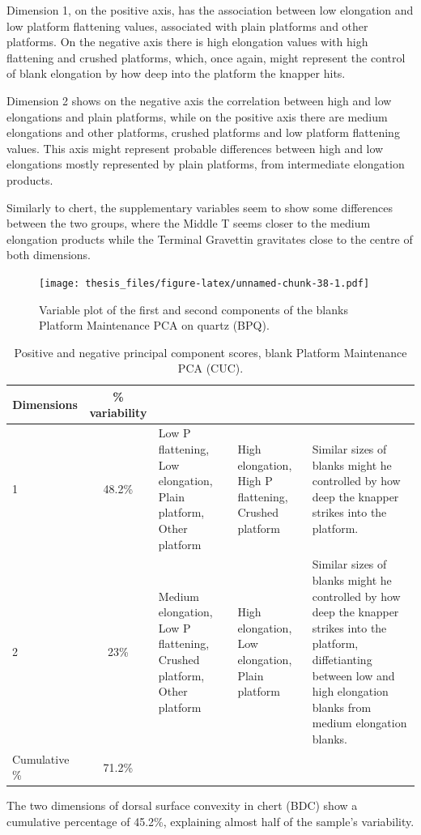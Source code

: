 \documentclass[12pt,twoside]{reedthesis}
\begin{document}
Dimension 1, on the positive axis, has the association between low elongation and low platform flattening values, associated with plain platforms and other platforms. On the negative axis there is high elongation values with high flattening and crushed platforms, which, once again, might represent the control of blank elongation by how deep into the platform the knapper hits.

Dimension 2 shows on the negative axis the correlation between high and low elongations and plain platforms, while on the positive axis there are medium elongations and other platforms, crushed platforms and low platform flattening values. This axis might represent probable differences between high and low elongations mostly represented by plain platforms, from intermediate elongation products.

Similarly to chert, the supplementary variables seem to show some differences between the two groups, where the Middle T seems closer to the medium elongation products while the Terminal Gravettin gravitates close to the centre of both dimensions.
\begin{figure}
\centering
\texttt{[image: thesis\_files/figure-latex/unnamed-chunk-38-1.pdf]}
\caption{\label{fig:unnamed-chunk-38}Variable plot of the first and second components of the blanks Platform Maintenance PCA on quartz (BPQ).}
\end{figure}
\begin{table}

\caption{\label{tab:unnamed-chunk-39}Positive and negative principal component scores, blank Platform Maintenance PCA (CUC).}
\centering
\begin{tabular}[t]{lc>{\raggedright\arraybackslash}p{3cm}>{\raggedright\arraybackslash}p{3cm}>{\raggedright\arraybackslash}p{3cm}}
\toprule
\multicolumn{1}{c}{\textbf{Dimensions}} & \multicolumn{1}{c}{\textbf{\% variability}} & \multicolumn{1}{>{\centering\arraybackslash}p{3cm}}{\textbf{+}} & \multicolumn{1}{>{\centering\arraybackslash}p{3cm}}{\textbf{-}} & \multicolumn{1}{>{\centering\arraybackslash}p{3cm}}{\textbf{Interpretation}}\\
\midrule
1 & 48.2\% & Low P flattening, Low elongation, Plain platform, Other platform & High elongation, High P flattening, Crushed platform & Similar sizes of blanks might he controlled by how deep the knapper strikes into the platform.\\
2 & 23\% & Medium elongation, Low P flattening, Crushed platform, Other platform & High elongation, Low elongation, Plain platform & Similar sizes of blanks might he controlled by how deep the knapper strikes into the platform, diffetianting between low and high elongation blanks from medium elongation blanks.\\
Cumulative \% & 71.2\% &  &  & \\
\bottomrule
\end{tabular}
\end{table}
The two dimensions of dorsal surface convexity in chert (BDC) show a cumulative percentage of 45.2\%, explaining almost half of the sample's variability.
\end{document}
